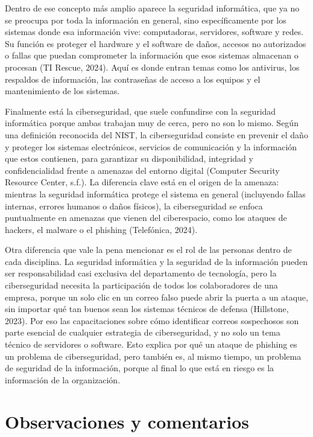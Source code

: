 \documentclass[12pt,letterpaper]{article}
\begin{document}
Dentro de ese concepto más amplio aparece la seguridad informática, que ya no se preocupa por toda la información en general, sino específicamente por los sistemas donde esa información vive: computadoras, servidores, software y redes. Su función es proteger el hardware y el software de daños, accesos no autorizados o fallas que puedan comprometer la información que esos sistemas almacenan o procesan (TI Rescue, 2024). Aquí es donde entran temas como los antivirus, los respaldos de información, las contraseñas de acceso a los equipos y el mantenimiento de los sistemas.

Finalmente está la ciberseguridad, que suele confundirse con la seguridad informática porque ambas trabajan muy de cerca, pero no son lo mismo. Según una definición reconocida del NIST, la ciberseguridad consiste en prevenir el daño y proteger los sistemas electrónicos, servicios de comunicación y la información que estos contienen, para garantizar su disponibilidad, integridad y confidencialidad frente a amenazas del entorno digital (Computer Security Resource Center, s.f.). La diferencia clave está en el origen de la amenaza: mientras la seguridad informática protege el sistema en general (incluyendo fallas internas, errores humanos o daños físicos), la ciberseguridad se enfoca puntualmente en amenazas que vienen del ciberespacio, como los ataques de hackers, el malware o el phishing (Telefónica, 2024).

Otra diferencia que vale la pena mencionar es el rol de las personas dentro de cada disciplina. La seguridad informática y la seguridad de la información pueden ser responsabilidad casi exclusiva del departamento de tecnología, pero la ciberseguridad necesita la participación de todos los colaboradores de una empresa, porque un solo clic en un correo falso puede abrir la puerta a un ataque, sin importar qué tan buenos sean los sistemas técnicos de defensa (Hillstone, 2023). Por eso las capacitaciones sobre cómo identificar correos sospechosos son parte esencial de cualquier estrategia de ciberseguridad, y no solo un tema técnico de servidores o software. Esto explica por qué un ataque de phishing es un problema de ciberseguridad, pero también es, al mismo tiempo, un problema de seguridad de la información, porque al final lo que está en riesgo es la información de la organización.

\section*{Observaciones y comentarios}
\end{document}
